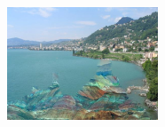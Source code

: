 \documentclass[11pt]{beamer}
\begin{document}
\begin{frame}
\begin{figure}
\begin{subfigure}[b]{0.36\textwidth}
    \end{subfigure}



\end{figure}

\begin{figure}
\includegraphics[width=0.4\textwidth]{IMG_0681_paisajes-pintura-2}
\end{figure}
\end{frame}
\end{document}
